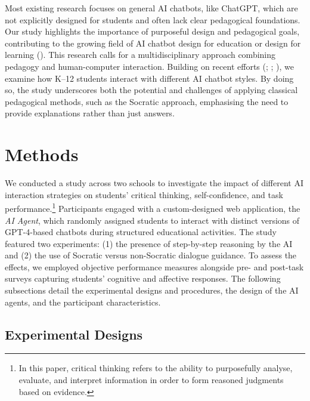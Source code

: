 \documentclass[
  11pt,
]{article}
\begin{document}
Most existing research focuses on general AI chatbots, like ChatGPT, which are not explicitly designed for students and often lack clear pedagogical foundations. Our study highlights the importance of purposeful design and pedagogical goals, contributing to the growing field of AI chatbot design for education or design for learning (). This research calls for a multidisciplinary approach combining pedagogy and human-computer interaction. Building on recent efforts (; ; ), we examine how K--12 students interact with different AI chatbot styles. By doing so, the study underscores both the potential and challenges of applying classical pedagogical methods, such as the Socratic approach, emphasising the need to provide explanations rather than just answers.

\section{Methods}\label{sec:methods}

We conducted a study across two schools to investigate the impact of different AI interaction strategies on students' critical thinking, self-confidence, and task performance.\footnote{
  In this paper, critical thinking refers to the ability to purposefully analyse, evaluate, and interpret information in order to form reasoned judgments based on evidence.} Participants engaged with a custom-designed web application, the \emph{AI Agent}, which randomly assigned students to interact with distinct versions of GPT-4-based chatbots during structured educational activities. The study featured two experiments: (1) the presence of step-by-step reasoning by the AI and (2) the use of Socratic versus non-Socratic dialogue guidance. To assess the effects, we employed objective performance measures alongside pre- and post-task surveys capturing students' cognitive and affective responses. The following subsections detail the experimental designs and procedures, the design of the AI agents, and the participant characteristics.

\subsection{Experimental Designs}\label{experimental-designs}
\end{document}
